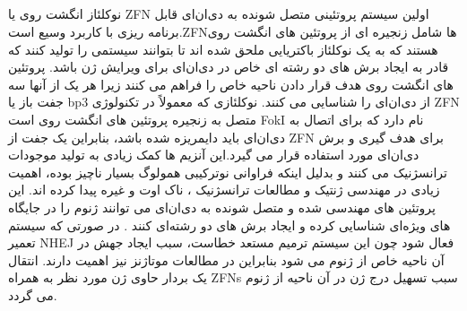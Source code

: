 \documentclass[12pt,a4paper,BCOR=.7cm,headsepline,bibliography=totoc]{report}
\begin{document}
\subsection{}

نوکلئاز انگشت روی یا ZFN اولین سیستم پروتئینی متصل شونده به دی‌ان‌ای قابل برنامه ریزی با کاربرد وسیع است.ZFNها شامل زنجیره ای از پروتئین های انگشت روی هستند که به یک نوکلئاز باکتریایی ملحق شده اند تا بتوانند سیستمی را تولید کنند که قادر به ایجاد برش های دو رشته ای خاص در دی‌ان‌ای برای ویرایش ژن باشد. پروتئین های انگشت روی هدف قرار دادن ناحیه خاص را فراهم می کنند زیرا هر یک از آنها سه جفت باز یا bp3 از دی‌ان‌ای را شناسایی می کنند. نوکلئازی که معمولاً در تکنولوژی ZFN متصل به زنجیره پروتئین های انگشت روی است FokI نام دارد که برای اتصال به دی‌ان‌ای باید دایمریزه شده باشد، بنابراین یک جفت از ZFN برای هدف گیری و برش دی‌ان‌ای مورد استفاده قرار می گیرد.این آنزیم ها کمک زیادی به تولید موجودات ترانسژنیک می کنند و بدلیل اینکه فراوانی نوترکیبی همولوگ بسیار ناچیز بوده، اهمیت زیادی در مهندسی ژنتیک و مطالعات ترانسژنیک ، ناک اوت و غیره پیدا کرده اند. این پروتئین های مهندسی شده و متصل شونده به دی‌ان‌ای می توانند ژنوم را در جایگاه های ویژه‌ای شناسایی کرده و ایجاد برش های دو رشته‌ای کنند . در صورتی که سیستم تعمير NHEJ فعال شود چون این سیستم ترمیم مستعد خطاست، سبب ایجاد جهش در آن ناحیه خاص از ژنوم می شود بنابراین در مطالعات موتاژنز نیز اهمیت دارند. انتقال یک بردار حاوی ژن مورد نظر به همراه ZFNs سبب تسهیل درج ژن در آن ناحیه از ژنوم می گردد.
\end{document}
